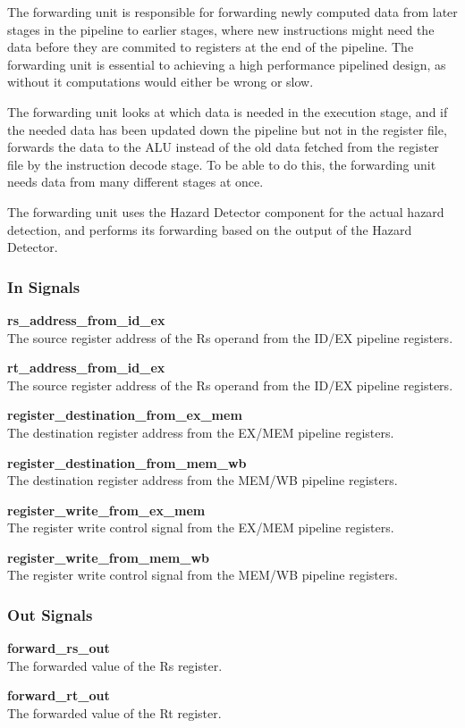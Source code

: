 The forwarding unit is responsible for forwarding newly computed data from later stages in the pipeline to earlier stages, where new instructions might need the data before they are commited to registers at the end of the pipeline.
The forwarding unit is essential to achieving a high performance pipelined design, as without it computations would either be wrong or slow.

The forwarding unit looks at which data is needed in the execution stage, and if the needed data has been updated down the pipeline but not in the register file, forwards the data to the ALU instead of the old data fetched from the register file by the instruction decode stage.
To be able to do this, the forwarding unit needs data from many different stages at once.

The forwarding unit uses the Hazard Detector component for the actual hazard detection, and performs its forwarding based on the output of the Hazard Detector.

\subsubsection{In Signals}

\begin{description}
\item{\textbf{rs\_address\_from\_id\_ex}} \\
    The source register address of the Rs operand from the ID/EX pipeline registers.

\item{\textbf{rt\_address\_from\_id\_ex}} \\
    The source register address of the Rs operand from the ID/EX pipeline registers.

\item{\textbf{register\_destination\_from\_ex\_mem}} \\
    The destination register address from the EX/MEM pipeline registers.

\item{\textbf{register\_destination\_from\_mem\_wb}} \\
    The destination register address from the MEM/WB pipeline registers.

\item{\textbf{register\_write\_from\_ex\_mem}} \\
    The register write control signal from the EX/MEM pipeline registers.

\item{\textbf{register\_write\_from\_mem\_wb}} \\
    The register write control signal from the MEM/WB pipeline registers.
\end{description}

\subsubsection{Out Signals}

\begin{description}
\item{\textbf{forward\_rs\_out}} \\
    The forwarded value of the Rs register.

\item{\textbf{forward\_rt\_out}} \\
    The forwarded value of the Rt register.

\end{description}
